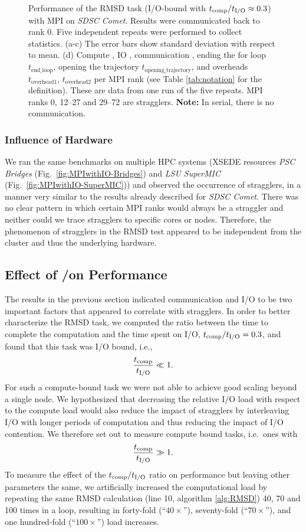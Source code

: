\begin{figure}
\caption{Performance of the RMSD task (I/O-bound with ${t}_{\text{comp}}/{t}_{\text{I/O}} \approx 0.3$) with MPI on \emph{SDSC Comet}.
Results were communicated back to rank 0. Five independent repeats were performed to collect statistics. (a-c) The error bars show
standard deviation with respect to mean. (d) Compute \tcomp, IO \tIO, communication \tcomm, ending the for loop $t_{\text{end\_loop}}$,
  opening the trajectory $t_{\text{opening\_trajectory}}$, and overheads $t_{\text{overhead1}}$, $t_{\text{overhead2}}$ per MPI rank (see Table \ref{tab:notation} for the definition).
These are data from one run of the five repeats. MPI ranks 0, 12--27 and 29--72 are stragglers. \textbf{Note:} In serial, there is no communication.}
\label{fig:MPIwithIO}
\end{figure} 

\subsubsection*{Influence of Hardware}
We ran the same benchmarks on multiple HPC systems (XSEDE resources \emph{PSC Bridges} (Fig.~\ref{fig:MPIwithIO-Bridges}) and \emph{LSU SuperMIC} (Fig.~\ref{fig:MPIwithIO-SuperMIC})) and observed the occurrence of stragglers, in a manner very similar to the results already described for \emph{SDSC Comet}.
There was no clear pattern in which certain MPI ranks would always be a straggler and neither could we trace stragglers to specific cores or nodes. 
Therefore, the phenomenon of stragglers in the RMSD test appeared to be independent from the cluster and thus the underlying hardware.


\subsection{Effect of \tcomp/\tIO on Performance}
\label{sec:bound}

The results in the previous section indicated communication and I/O to be two important factors that appeared to correlate with stragglers. 
In order to better characterize the RMSD task, we computed the ratio between the time to complete the computation and the time spent on I/O, ${t}_{\text{comp}}/{t}_{\text{I/O}} = 0.3$, and found that this task was I/O bound, i.e.,
\begin{gather*}
  \frac{{t}_{\text{comp}}}{{t}_{\text{I/O}}} \ll 1.
\end{gather*}
For such a compute-bound task we were not able to achieve good scaling beyond a single node. 
We hypothesized that decreasing the relative I/O load with respect to the compute load would also reduce the impact of stragglers by interleaving I/O with longer periods of computation and thus reducing the impact of I/O contention.
We therefore set out to measure compute bound tasks, i.e.\ ones with
\begin{gather*}
  \frac{{t}_{\text{comp}}}{{t}_{\text{I/O}}} \gg 1.
\end{gather*}
To measure the effect of the ${t}_{\text{comp}}/{t}_{\text{I/O}}$ ratio on performance but leaving other parameters the same, we artificially increased the computational load by repeating the same RMSD calculation (line 10, algorithm \ref{alg:RMSD}) 40, 70 and 100 times in a loop, resulting in forty-fold (``$40\times$''), seventy-fold (``$70\times$''), and one hundred-fold (``$100\times$'') load increases.


